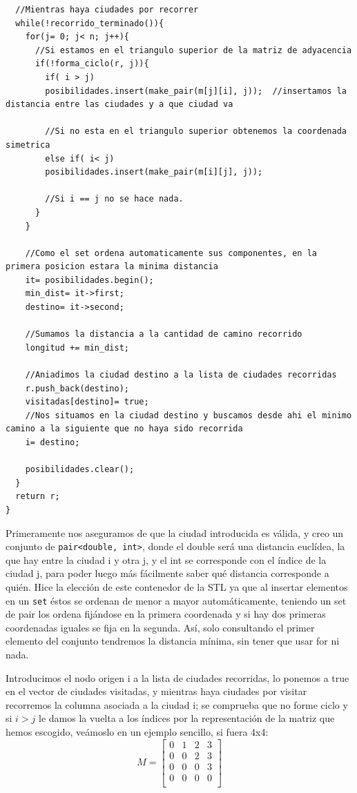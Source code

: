\documentclass[12pt]{article}
\begin{document}
\begin{itemize}[wide, nosep, labelindent = 0pt, topsep = 1ex]
\begin{lstlisting}
  //Mientras haya ciudades por recorrer
  while(!recorrido_terminado()){
    for(j= 0; j< n; j++){
      //Si estamos en el triangulo superior de la matriz de adyacencia
      if(!forma_ciclo(r, j)){
        if( i > j)
        posibilidades.insert(make_pair(m[j][i], j));  //insertamos la distancia entre las ciudades y a que ciudad va

        //Si no esta en el triangulo superior obtenemos la coordenada simetrica
        else if( i< j)
        posibilidades.insert(make_pair(m[i][j], j));

        //Si i == j no se hace nada.
      }
    }

    //Como el set ordena automaticamente sus componentes, en la primera posicion estara la minima distancia
    it= posibilidades.begin();
    min_dist= it->first;
    destino= it->second;

    //Sumamos la distancia a la cantidad de camino recorrido
    longitud += min_dist;

    //Aniadimos la ciudad destino a la lista de ciudades recorridas
    r.push_back(destino);
    visitadas[destino]= true;
    //Nos situamos en la ciudad destino y buscamos desde ahi el minimo camino a la siguiente que no haya sido recorrida
    i= destino;

    posibilidades.clear();
  }
  return r;
}
\end{lstlisting}
Primeramente nos aseguramos de que la ciudad introducida es válida, y creo un conjunto de \verb|pair<double, int>|, donde el double será una distancia euclídea, la que hay entre la ciudad i y otra j, y el int se corresponde con el índice de la ciudad j, para poder luego más fácilmente saber qué distancia corresponde a quién. Hice la elección de este contenedor de la STL ya que al insertar elementos en un \verb|set| éstos se ordenan de menor a mayor automáticamente, teniendo un set de pair los ordena fijándose en la primera coordenada y si hay dos primeras coordenadas iguales se fija en la segunda. Así, solo consultando el primer elemento del conjunto tendremos la distancia mínima, sin tener que usar for ni nada.

Introducimos el nodo origen i a la lista de ciudades recorridas, lo ponemos a true en el vector de ciudades visitadas, y mientras haya ciudades por visitar recorremos la columna asociada a la ciudad i; se comprueba que no forme ciclo y si $i>j$ le damos la vuelta a los índices por la representación de la matriz que hemos escogido, veámoslo en un ejemplo sencillo, si fuera 4x4: 
\[
   M=
  \left[ {\begin{array}{cccc}
   0 & 1 & 2 & 3 \\
   0 & 0 & 2 & 3 \\
   0 & 0 & 0 & 3 \\
   0 & 0 & 0 & 0 \\
  \end{array} } \right]
\]



\end{itemize}
\end{document}
